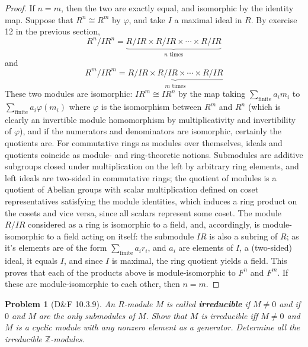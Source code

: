 \documentclass{article}
\newtheorem{plm}{Problem}
\begin{document}
\begin{proof}
  If $n = m$, then the two are exactly equal, and isomorphic by the identity map.
  Suppose that $R^{n} \cong R^{m}$ by $\varphi$, and take $I$ a maximal ideal in $R$.
  By exercise 12 in the previous section,
  \[
    R^{n} / IR^{n} = \underbrace{R / IR \times R / IR \times \cdots \times R / IR}_{n \text{ times}}
  \]
  and
  \[
    R^{m} / IR^{m} = \underbrace{R / IR \times R / IR \times \cdots \times R / IR}_{m \text{ times}}
  \]
  These two modules are isomorphic: $IR^{m} \cong IR^{n}$ by the map taking $\sum_{\text{finite}}a_{i}m_{i}$ to $\sum_{\text{finite}}a_{i}\varphi(m_{i})$
  where $\varphi$ is the isomorphism between $R^{m}$ and $R^{n}$ (which is clearly an invertible module homomorphism by multiplicativity
  and invertibility of $\varphi$), and if the numerators and denominators are isomorphic, certainly the quotients are.
  For commutative rings as modules over themselves, ideals and quotients coincide as module- and ring-theoretic notions.
  Submodules are additive subgroups closed under multiplication on the left by arbitrary ring elements,
  and left ideals are two-sided in commutative rings; the quotient of modules is a quotient of Abelian groups with scalar multiplication defined
  on coset representatives satisfying the module identities, which induces a ring product on the cosets and vice versa,
  since all scalars represent some coset.
  The module $R / IR$ considered as a ring is isomorphic to a field, and, accordingly, is module-isomorphic to a field acting on itself:
  the submodule $IR$ is also a subring of $R$; as it's elements are of the form $\sum_{\text{finite}}a_{i}r_{i}$, and $a_{i}$ are elements of $I$,
  a (two-sided) ideal, it equals $I$, and since $I$ is maximal, the ring quotient yields a field.
  This proves that each of the products above is module-isomorphic to $F^{n}$ and $F^{m}$.
  If these are module-isomorphic to each other, then $n = m$. %
\end{proof}

\begin{plm}[D\&F 10.3.9]
  An $R$-module $M$ is called \textbf{irreducible} if $M \neq 0$ and if $0$ and $M$ are the only submodules of $M$.
  Show that $M$ is irreducible iff $M \neq 0$ and $M$ is a cyclic module with any nonzero element as a generator.
  Determine all the irreducible $\mathbb{Z}$-modules.
\end{plm}
\end{document}
